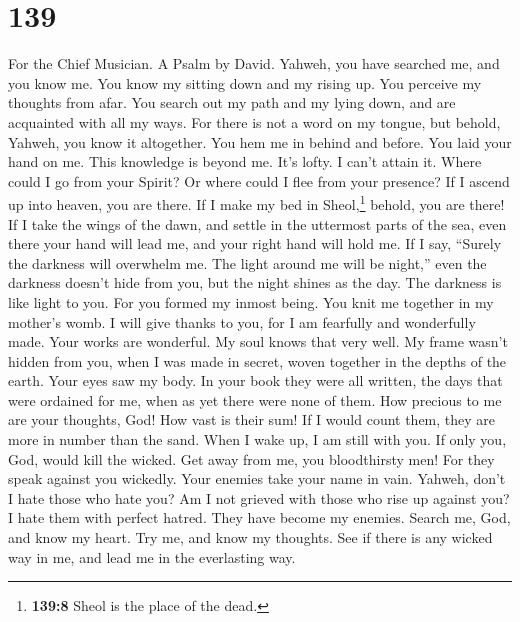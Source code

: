 \hypertarget{section-131}{%
\section{139}\label{section-131}}

For the Chief Musician. A Psalm by David.  Yahweh, you
have searched me, and you know me.  You know my sitting
down and my rising up. You perceive my thoughts from afar.
 You search out my path and my lying down, and are
acquainted with all my ways.  For there is not a word on
my tongue, but behold, Yahweh, you know it altogether. 
You hem me in behind and before. You laid your hand on me.
 This knowledge is beyond me. It's lofty. I can't attain
it.  Where could I go from your Spirit? Or where could I
flee from your presence?  If I ascend up into heaven, you
are there. If I make my bed in Sheol,\footnote{\textbf{139:8} Sheol is
  the place of the dead.} behold, you are there!  If I
take the wings of the dawn, and settle in the uttermost parts of the
sea,  even there your hand will lead me, and your right
hand will hold me.  If I say, ``Surely the darkness will
overwhelm me. The light around me will be night,''  even
the darkness doesn't hide from you, but the night shines as the day. The
darkness is like light to you.  For you formed my inmost
being. You knit me together in my mother's womb.  I will
give thanks to you, for I am fearfully and wonderfully made. Your works
are wonderful. My soul knows that very well.  My frame
wasn't hidden from you, when I was made in secret, woven together in the
depths of the earth.  Your eyes saw my body. In your book
they were all written, the days that were ordained for me, when as yet
there were none of them.  How precious to me are your
thoughts, God! How vast is their sum!  If I would count
them, they are more in number than the sand. When I wake up, I am still
with you.  If only you, God, would kill the wicked. Get
away from me, you bloodthirsty men!  For they speak
against you wickedly. Your enemies take your name in vain.
 Yahweh, don't I hate those who hate you? Am I not
grieved with those who rise up against you?  I hate them
with perfect hatred. They have become my enemies.  Search
me, God, and know my heart. Try me, and know my thoughts.
 See if there is any wicked way in me, and lead me in the
everlasting way.

